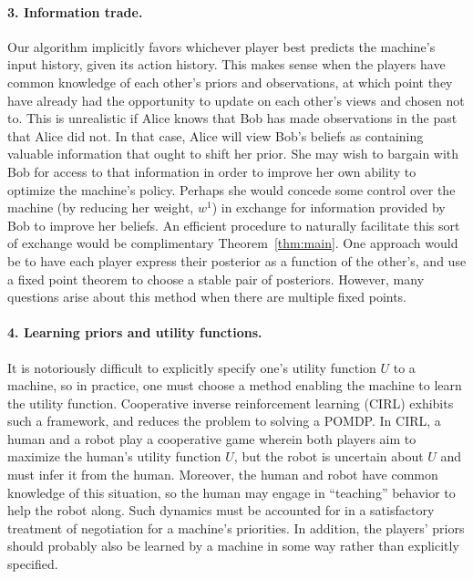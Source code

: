 \documentclass{article}  %
\newcommand{\thm}[1]{Theorem~\ref{thm:#1}}
\begin{document}
\paragraph{3. Information trade.}  Our algorithm implicitly favors whichever player best predicts the machine's input history, given its action history.  This makes sense when the players have common knowledge of each other's priors and observations, at which point they have already had the opportunity to update on each other's views and chosen not to.  This is unrealistic if Alice knows that Bob has made observations in the past that Alice did not.  In that case, Alice will view Bob's beliefs as containing valuable information that ought to shift her prior.  She may wish to bargain with Bob for access to that information in order to improve her own ability to optimize the machine's policy.  Perhaps she would concede some control over the machine (by reducing her weight, $w^1$) in exchange for information provided by Bob to improve her beliefs.  An efficient procedure to naturally facilitate this sort of exchange would be complimentary \thm{main}.  One approach would be to have each player express their posterior as a function of the other's, and use a fixed point theorem to choose a stable pair of posteriors.  However, many questions arise about this method when there are multiple fixed points.

\paragraph{4. Learning priors and utility functions.}  It is notoriously difficult to explicitly specify one's utility function $U$ to a machine, so in practice, one must choose a method enabling the machine to learn the utility function.  Cooperative inverse reinforcement learning (CIRL) \citep{hadfield2016cooperative} exhibits such a framework, and reduces the problem to solving a POMDP.   In CIRL, a human and a robot play a cooperative game wherein both players aim to maximize the human's utility function $U$, but the robot is uncertain about $U$ and must infer it from the human.  Moreover, the human and robot have common knowledge of this situation, so the human may engage in ``teaching'' behavior to help the robot along.  Such dynamics must be accounted for in a satisfactory treatment of negotiation for a machine's priorities.  In addition, the players' priors should probably also be learned by a machine in some way rather than explicitly specified.
\end{document}
